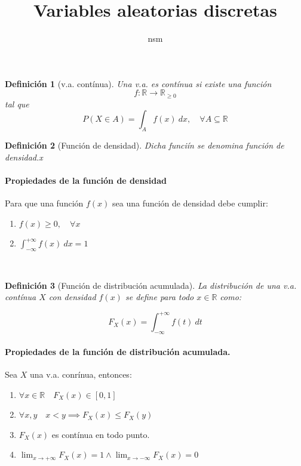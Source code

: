 \documentclass{article}
\newtheorem{mydef}{Definici\'on}
\begin{document}
\title{Variables aleatorias discretas}
\author{nsm}

\maketitle


\begin{mydef}[v.a. cont\'inua]
  Una v.a. es \emph{cont\'inua} si existe una funci\'on
  \[
    f:\mathbb{R} \to \mathbb{R}_{\geq 0}
  \]
  tal que
  \[
    P(X \in A) = \int_A f(x) \ dx , \quad \forall A \subseteq \mathbb{R}
  \]
\end{mydef}

\begin{mydef}[Funci\'on de densidad]
  Dicha funci\'in se denomina \emph{funci\'on de densidad}.x
\end{mydef}

\paragraph{Propiedades de la funci\'on de densidad}
  Para que una funci\'on \(f(x)\) sea una funci\'on de densidad
  debe cumplir:
\begin{enumerate}
    \item \( f(x) \geq 0, \quad \forall x \)
    \item \( \int_{-\infty}^{+\infty} f(x) \ dx = 1\)
\end{enumerate}
\

\begin{mydef}[Funci\'on de distribuci\'on acumulada]
  La \emph{distribuci\'on} de una v.a. cont\'inua \(X\) con
  densidad \(f(x)\) se define para todo $x \in \mathbb{R}$ como:

  \[
    F_X(x) = \int_{-\infty}^{+\infty} f(t) \ dt
  \]
\end{mydef}

\paragraph{Propiedades de la funci\'on de distribuci\'on acumulada.}
Sea \(X\) una v.a. conr\'inua, entonces:
\begin{enumerate}
    \item $ \forall x \in \mathbb{R} \quad F_X(x) \in [0,1] $
    \item $ \forall x, y \quad x < y \implies F_X(x) \leq F_X(y) $
    \item \(F_X(x)\) es cont\'inua en todo punto.
    \item \(\lim_{x\to +\infty} F_X(x)=1 \land
      \lim_{x\to -\infty} F_X(x) = 0\)
\end{enumerate}
\
\end{document}
